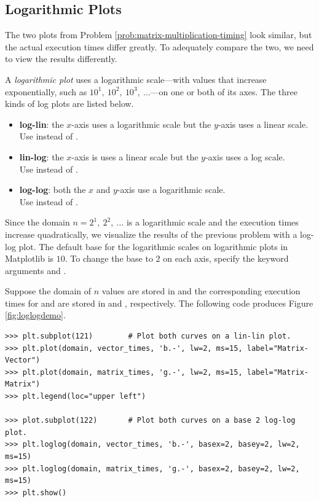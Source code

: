 \subsection*{Logarithmic Plots} %

The two plots from Problem \ref{prob:matrix-multiplication-timing} look similar, but the actual execution times differ greatly.
To adequately compare the two, we need to view the results differently.

A \emph{logarithmic plot} uses a logarithmic scale---with values that increase exponentially, such as $10^1,\ 10^2,\ 10^3,\ \ldots$---on one or both of its axes.
The three kinds of log plots are listed below.

\begin{itemize}
\item \textbf{log-lin}: the $x$-axis uses a logarithmic scale but the $y$-axis uses a linear scale.\\
Use  instead of .
\item \textbf{lin-log}: the $x$-axis is uses a linear scale but the $y$-axis uses a log scale.\\
Use  instead of .
\item \textbf{log-log}: both the $x$ and $y$-axis use a logarithmic scale.\\
Use  instead of .
\end{itemize}

Since the domain $n = 2^1,\ 2^2,\ \ldots$ is a logarithmic scale and the execution times increase quadratically, we visualize the results of the previous problem with a log-log plot.
The default base for the logarithmic scales on logarithmic plots in Matplotlib is $10$.
To change the base to $2$ on each axis, specify the keyword arguments  and .

Suppose the domain of $n$ values are stored in  and the corresponding execution times for  and  are stored in  and , respectively.
The following code produces Figure \ref{fig:loglogdemo}.

\begin{lstlisting}
>>> plt.subplot(121)        # Plot both curves on a lin-lin plot.
>>> plt.plot(domain, vector_times, 'b.-', lw=2, ms=15, label="Matrix-Vector")
>>> plt.plot(domain, matrix_times, 'g.-', lw=2, ms=15, label="Matrix-Matrix")
>>> plt.legend(loc="upper left")

>>> plot.subplot(122)       # Plot both curves on a base 2 log-log plot.
>>> plt.loglog(domain, vector_times, 'b.-', basex=2, basey=2, lw=2, ms=15)
>>> plt.loglog(domain, matrix_times, 'g.-', basex=2, basey=2, lw=2, ms=15)
>>> plt.show()
\end{lstlisting}

